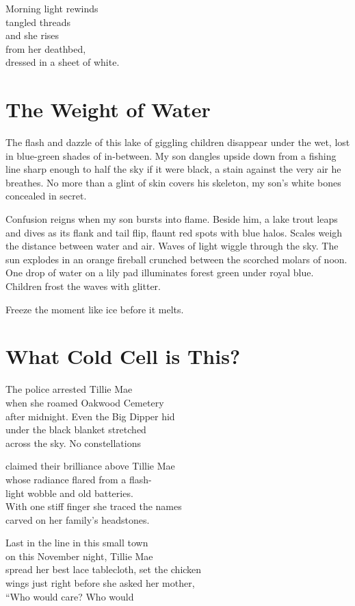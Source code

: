\documentclass[twoside,10pt]{book}
\begin{document}
Morning light rewinds\\
tangled threads\\
and she rises\\
from her deathbed,\\
dressed in a sheet of white.


\clearpage
\section{The Weight of Water}

The flash and dazzle of this lake of giggling children disappear under
the wet, lost in blue-green shades of in-between. My son dangles upside
down from a fishing line sharp enough to half the sky if it were black,
a stain against the very air he breathes. No more than a glint of skin
covers his skeleton, my son's white bones concealed in secret.

Confusion reigns when my son bursts into flame. Beside him, a lake trout
leaps and dives as its flank and tail flip, flaunt red spots with blue
halos. Scales weigh the distance between water and air. Waves of light
wiggle through the sky. The sun explodes in an orange fireball crunched
between the scorched molars of noon. One drop of water on a lily pad
illuminates forest green under royal blue. Children frost the waves with
glitter.

Freeze the moment like ice before it melts.


\clearpage
\section{What Cold Cell is This?}

The police arrested Tillie Mae\\
when she roamed Oakwood Cemetery\\
after midnight. Even the Big Dipper hid\\
under the black blanket stretched\\
across the sky. No constellations

claimed their brilliance above Tillie Mae\\
whose radiance flared from a flash-\\
light wobble and old batteries.\\
With one stiff finger she traced the names\\
carved on her family's headstones.

Last in the line in this small town\\
on this November night, Tillie Mae\\
spread her best lace tablecloth, set the chicken\\
wings just right before she asked her mother,\\
``Who would care? Who would
\end{document}
